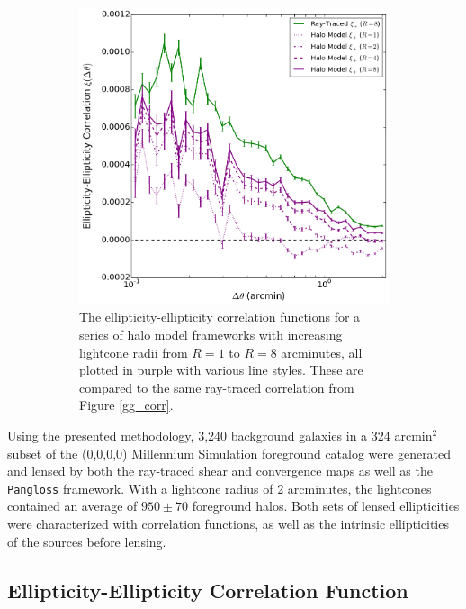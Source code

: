 \documentclass[%
 reprint,
 amsmath,amssymb,
 aps,nofootinbib
]{revtex4-1}
\begin{document}
\begin{figure}
\begin{subfigure}{0.475\textwidth}
        \includegraphics[width=\textwidth]{figs-swe/gg_corr_series.png}
        \captionsetup{justification=raggedright,singlelinecheck=false}
        \caption{The ellipticity-ellipticity correlation functions for a series of halo model frameworks with increasing lightcone radii from $R=1$ to $R=8$ arcminutes, all plotted in purple with various line styles. These are compared to the same ray-traced correlation from Figure \ref{gg_corr}.}
        \label{gg_corr_series}
    \end{subfigure}
    \caption{}
\end{figure}

Using the presented methodology, 3,240 background galaxies in a 324 arcmin$^2$ subset of the (0,0,0,0) Millennium Simulation foreground catalog were generated and lensed by both the ray-traced shear and convergence maps as well as the \texttt{Pangloss} framework. With a lightcone radius of 2 arcminutes, the lightcones contained an average of ${950\pm70}$ foreground halos. Both sets of lensed ellipticities were characterized with correlation functions, as well as the intrinsic ellipticities of the sources before lensing.

\subsection*{Ellipticity-Ellipticity Correlation Function}
\end{document}

